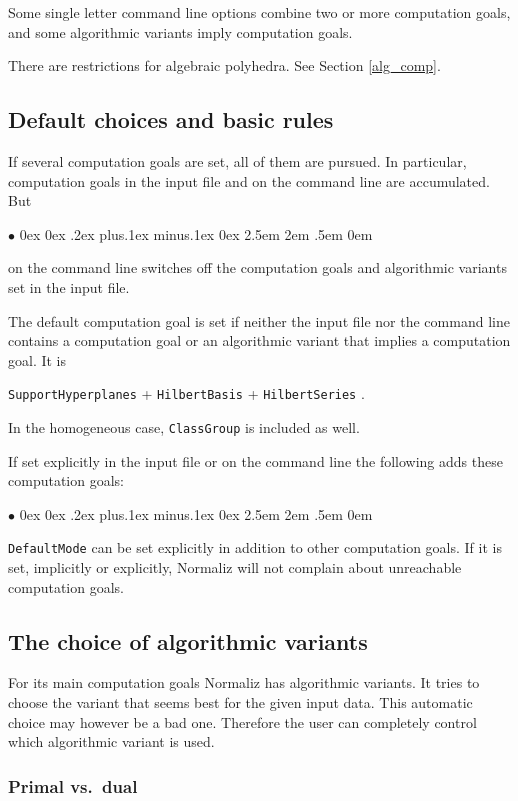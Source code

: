 \documentclass[12pt,a4paper]{scrartcl}
\newcommand{\stdli}{ \topsep0ex \partopsep0ex %
\parsep.2ex plus.1ex minus.1ex \itemsep0ex%
\leftmargin2.5em \labelwidth2em \labelsep.5em \rightmargin0em}%
\renewenvironment{itemize}{\begin{list}{{$\bullet$}}{\stdli}}{\end{list}}
\theoremstyle{definition}
\def\itemtt[#1]{\item[\textbf{\ttt{#1}}]}
\def\ttt{\texttt}
\begin{document}
Some single letter command line options combine two or more computation goals, and some algorithmic variants imply computation goals.

There are restrictions for algebraic polyhedra. See Section \ref{alg_comp}.

\subsection{Default choices and basic rules}

If several computation goals are set, all of them are pursued. In particular, computation goals in the input file and on the command line are accumulated. But
\begin{itemize}
	\itemtt[-{}-ignore, -i] on the command line switches off the computation goals and algorithmic variants set in the input file.
\end{itemize}

The default computation goal is set if neither the input file nor the command line contains a computation goal or an algorithmic variant that implies a computation goal. It is
\begin{center}
	\verb|SupportHyperplanes| + \verb|HilbertBasis| + \verb|HilbertSeries| .
\end{center} 
In the homogeneous case,  \verb|ClassGroup| is included as well.

If set explicitly in the input file or on the command line the following adds these computation goals:
\begin{itemize}
	\itemtt[DefaultMode]
\end{itemize}

\verb|DefaultMode| can be set explicitly in addition to other computation goals. If it is set, implicitly or explicitly, Normaliz will not complain about unreachable computation goals.

\subsection{The choice of algorithmic variants}

For its main computation goals Normaliz has algorithmic variants. It tries to choose the variant that seems best for the given input data. This automatic choice may however be a bad one. Therefore the user can completely control which algorithmic variant is used.

\subsubsection{Primal vs.\ dual}
\end{document}
